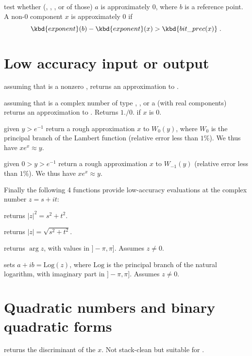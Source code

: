  test whether (, ,
, or  of those) $a$ is approximately $0$, where $b$
is a reference point. A non-$0$  component $x$ is
approximately $0$ if
$$\kbd{exponent}(b) - \kbd{exponent}(x) > \kbd{bit\_prec(x)}\;.$$

\section{Low accuracy input or output}

 assuming that  is a nonzero ,
returns an approximation to .

 assuming that  is a complex number
of type , ,  or a  (with real
components) returns an approximation to . Returns $1./0.$
if $x$ is $0$.

 given $y > e^{-1}$ return
a rough approximation $x$ to $W_0(y)$, where $W_0$ is the principal branch
of the Lambert function (relative error less than $1\%$).
We thus have $x e^x \approx y$.

 given $0 > y > e^{-1}$ return a rough
approximation $x$ to $W_{-1}(y)$ (relative error less than $1\%$).
We thus have $x e^x \approx y$.

Finally the following 4 functions provide low-accuracy evaluations
at the complex number $z = s +it$:

 returns $|z|^2 = s^2 + t^2$.

 returns $|z| = \sqrt{s^2 + t^2}$.

 returns $\arg z$, with
values in $]-\pi, \pi]$. Assumes $z \neq 0$.

sets $a + ib = \text{Log}(z)$, where $\text{Log}$ is the principal branch of
the natural logarithm, with imaginary part in $]-\pi,\pi]$. Assumes $z \neq 0$.

\section{Quadratic numbers and binary quadratic forms}

 returns the discriminant of the  $x$.
Not stack-clean but suitable for .

